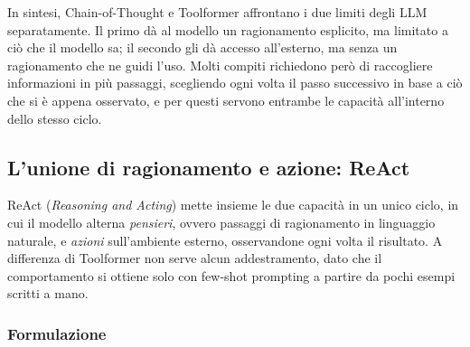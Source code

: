 In sintesi, Chain-of-Thought e Toolformer affrontano i due limiti degli LLM separatamente. Il primo dà al modello un ragionamento esplicito, ma limitato a ciò che il modello sa; il secondo gli dà accesso all'esterno, ma senza un ragionamento che ne guidi l'uso. Molti compiti richiedono però di raccogliere informazioni in più passaggi, scegliendo ogni volta il passo successivo in base a ciò che si è appena osservato, e per questi servono entrambe le capacità all'interno dello stesso ciclo.

\subsection{L'unione di ragionamento e azione: ReAct}
\label{sec:react}

ReAct (\emph{Reasoning and Acting}) \cite{yao2023react} mette insieme le due capacità in un unico ciclo, in cui il modello alterna \emph{pensieri}, ovvero passaggi di ragionamento in linguaggio naturale, e \emph{azioni} sull'ambiente esterno, osservandone ogni volta il risultato. A differenza di Toolformer non serve alcun addestramento, dato che il comportamento si ottiene solo con few-shot prompting a partire da pochi esempi scritti a mano.

\subsubsection{Formulazione}

